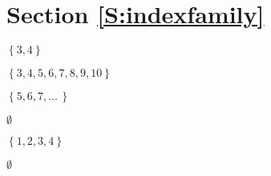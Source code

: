\section*{Section \ref{S:indexfamily}}
\begin{multicols}{2}
\begin{list}{\bf{\ref{exer:sec45-example1}.}}
\item \begin{list}{\bf{(a)}}
\item $\left\{ 3, 4 \right\}$ 
\end{list}
\end{list}

\begin{list}{}
\item \begin{list}{\bf{(d)}}
\item $\left\{ 3, 4, 5, 6, 7, 8, 9, 10 \right\}$
\end{list}
\end{list}
\end{multicols}



\begin{multicols}{2}
\begin{list}{\bf{\ref{exer:sec45-example2}.}}
\item \begin{list}{\bf{(a)}}
\item $\left\{ 5, 6, 7, \ldots \,\right\}$
\end{list}
\end{list}

\begin{list}{}
\item \begin{list}{\bf{(c)}}
\item $\emptyset$
\end{list}
\end{list}

\begin{list}{}
\item \begin{list}{\bf{(d)}}
\item $\left\{1, 2, 3, 4 \right\}$
\end{list}
\end{list}

\begin{list}{}
\item \begin{list}{\bf{(f)}}
\item $\emptyset$
\end{list}
\end{list}
\end{multicols}


